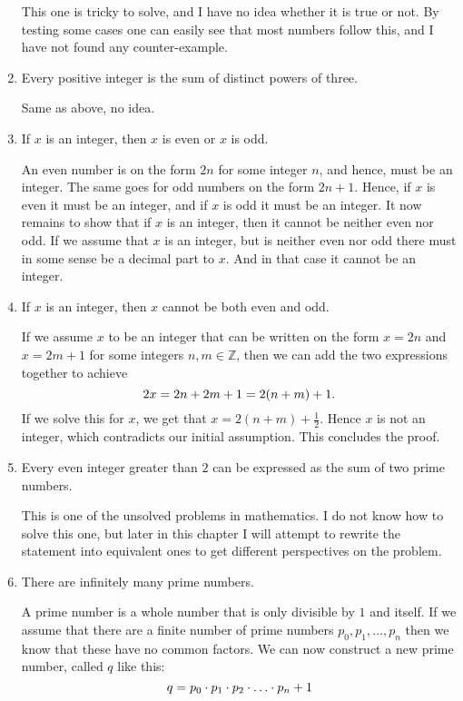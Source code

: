 \documentclass[a4paper, 11pt]{report}
\theoremstyle{plain}
\theoremstyle{definition}
\begin{document}
\begin{enumerate}
    This one is tricky to solve, and I have no idea whether it is true or
    not.  By testing some cases one can easily see that most numbers follow
    this, and I have not found any counter-example.

  \item Every positive integer is the sum of distinct powers of three.

    Same as above, no idea.

  \item If $x$ is an integer, then $x$ is even or $x$ is odd.

    An even number is on the form $2n$ for some integer $n$, and hence,
    must be an integer.  The same goes for odd numbers on the form $2n +
    1$. Hence, if $x$ is even it must be an integer, and if $x$ is odd it
    must be an integer.  It now remains to show that if $x$ is an integer,
    then it cannot be neither even nor odd. If we assume that $x$ is an
    integer, but is neither even nor odd there must in some sense be a
    decimal part to $x$. And in that case it cannot be an integer.

  \item If $x$ is an integer, then $x$ cannot be both even and odd.

    If we assume $x$ to be an integer that can be written on the form $x =
    2n$ and $x = 2m + 1$ for some integers $n, m \in \mathbb{Z}$, then we
    can add the two expressions together to achieve
    \begin{equation}
      \notag
      2x = 2n + 2m + 1 = 2(n + m) + 1.
    \end{equation}
    If we solve this for $x$, we get that $x = 2(n+m) + \frac{1}{2}$. Hence
    $x$ is not an integer, which contradicts our initial assumption.  This
    concludes the proof.

  \item Every even integer greater than $2$ can be expressed as the sum of two prime numbers.

    This is one of the unsolved problems in mathematics. I do not know how
    to solve this one, but later in this chapter I will attempt to rewrite
    the statement into equivalent ones to get different perspectives on the
    problem.

  \item There are infinitely many prime numbers.

    A prime number is a whole number that is only divisible by $1$ and
    itself. If we assume that there are a finite number of prime numbers
    $p_0, p_1, \ldots, p_n$ then we know that these have no common factors.
    We can now construct a new prime number, called $q$ like this:
    \begin{equation}
      \notag
      q = p_0\cdot p_1 \cdot p_2 \cdot \ldots \cdot p_n + 1
    \end{equation}


\end{enumerate}
\end{document}
